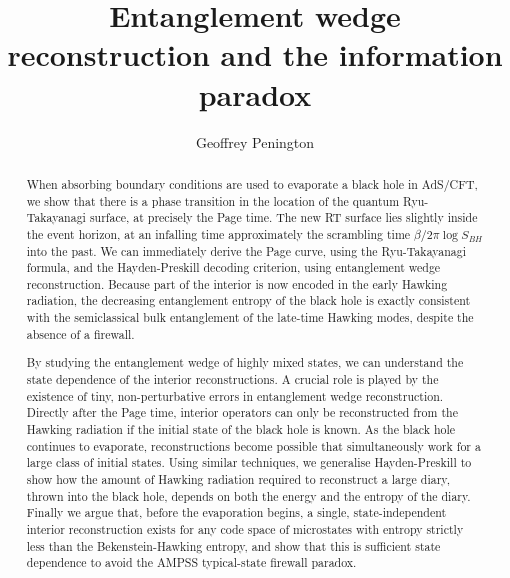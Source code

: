 \documentclass[12pt]{article}
\begin{document}
\title{\bf Entanglement wedge reconstruction and the information paradox}
\author[1]{Geoffrey Penington}
\date{}
\maketitle
\begin{abstract}
When absorbing boundary conditions are used to evaporate a black hole in AdS/CFT, we show that there is a phase transition in the location of the quantum Ryu-Takayanagi surface, at precisely the Page time. The new RT surface lies slightly inside the event horizon, at an infalling time approximately the scrambling time $\beta/2\pi \log S_{BH}$ into the past. We can immediately derive the Page curve, using the Ryu-Takayanagi formula, and the Hayden-Preskill decoding criterion, using entanglement wedge reconstruction. Because part of the interior is now encoded in the early Hawking radiation, the decreasing entanglement entropy of the black hole is exactly consistent with the semiclassical bulk entanglement of the late-time Hawking modes, despite the absence of a firewall.

By studying the entanglement wedge of highly mixed states, we can understand the state dependence of the interior reconstructions. A crucial role is played by the existence of tiny, non-perturbative errors in entanglement wedge reconstruction. Directly after the Page time, interior operators can only be reconstructed from the Hawking radiation if the initial state of the black hole is known. As the black hole continues to evaporate, reconstructions become possible that simultaneously work for a large class of initial states. Using similar techniques, we generalise Hayden-Preskill to show how the amount of Hawking radiation required to reconstruct a large diary, thrown into the black hole, depends on both the energy and the entropy of the diary. Finally we argue that, before the evaporation begins, a single, state-independent interior reconstruction exists for any code space of microstates with entropy strictly less than the Bekenstein-Hawking entropy, and show that this is sufficient state dependence to avoid the AMPSS typical-state firewall paradox.

\noindent
\let\thefootnote\relax\footnotetext{\hspace{-0.75cm}{\tt geoffp@stanford.edu}}

\end{abstract}
\end{document}
